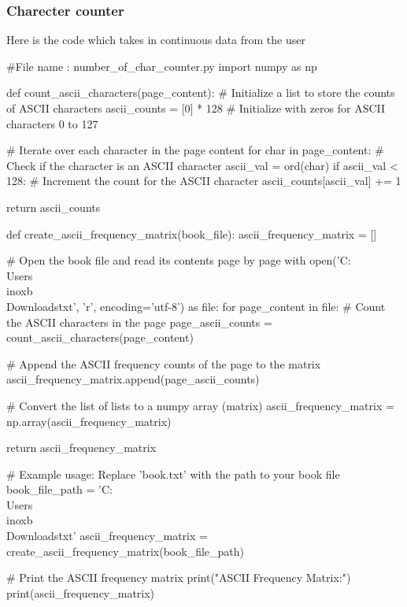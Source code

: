 \documentclass[scrartcl]{article}
\begin{document}
\subsubsection{Charecter counter}
Here is the code which takes in continuous data from the user 
\begin{python}
#File name : number_of_char_counter.py
import numpy as np

def count_ascii_characters(page_content):
    # Initialize a list to store the counts of ASCII characters
    ascii_counts = [0] * 128  # Initialize with zeros for ASCII characters 0 to 127

    # Iterate over each character in the page content
    for char in page_content:
        # Check if the character is an ASCII character
        ascii_val = ord(char)
        if ascii_val < 128:
            # Increment the count for the ASCII character
            ascii_counts[ascii_val] += 1

    return ascii_counts

def create_ascii_frequency_matrix(book_file):
    ascii_frequency_matrix = []

    # Open the book file and read its contents page by page
    with open('C:\\Users\\inoxb\\Downloads\.txt', 'r', encoding='utf-8') as file:
        for page_content in file:
            # Count the ASCII characters in the page
            page_ascii_counts = count_ascii_characters(page_content)

            # Append the ASCII frequency counts of the page to the matrix
            ascii_frequency_matrix.append(page_ascii_counts)

    # Convert the list of lists to a numpy array (matrix)
    ascii_frequency_matrix = np.array(ascii_frequency_matrix)

    return ascii_frequency_matrix

# Example usage: Replace 'book.txt' with the path to your book file
book_file_path = 'C:\\Users\\inoxb\\Downloads\.txt'
ascii_frequency_matrix = create_ascii_frequency_matrix(book_file_path)

# Print the ASCII frequency matrix
print("ASCII Frequency Matrix:")
print(ascii_frequency_matrix)
\end{python}
\end{document}
